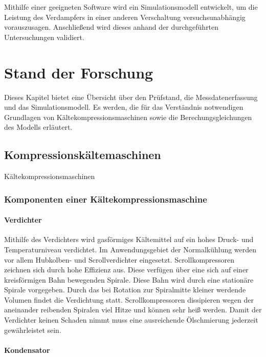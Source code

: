 Mithilfe einer geeigneten Software wird ein Simulationsmodell entwickelt, um die Leistung des Verdampfers in einer anderen Verschaltung versuchsunabhängig vorauszusagen. Anschließend wird dieses anhand der durchgeführten Untersuchungen validiert. 


\chapter{Stand der Forschung}
\label{cha:Technik}

Dieses Kapitel bietet eine Übersicht über den Prüfstand, die Messdatenerfassung und das Simulationsmodell. Es werden, die für das Verständnis notwendigen Grundlagen von Kältekompressionsmaschinen sowie die Berechungsgleichungen des Modells erläutert.

\section{Kompressionskältemaschinen}
\label{sec:Stand der Technik}

Kältekompressionsmaschinen

\subsection{Komponenten einer Kältekompressionsmaschine}
\label{subsec:Komponenten einer Kältekompressionsmaschine}

\subsubsection{Verdichter}
\label{subsubsec:Verdichter}

Mithilfe des Verdichters wird gasförmiges Kältemittel auf ein hohes Druck- und Temperaturniveau verdichtet. Im Anwendungsgebiet der Normalkühlung werden vor allem Hubkolben- und Scrollverdichter eingesetzt. Scrollkompressoren zeichnen sich durch hohe Effizienz aus. Diese verfügen über eine sich auf einer kreisförmigen Bahn bewegenden Spirale. Diese Bahn wird durch eine stationäre Spirale vorgegeben. Durch das bei Rotation zur Spiralmitte kleiner werdende Volumen findet die Verdichtung statt. Scrollkompressoren dissipieren wegen der aneinander reibenden Spiralen viel Hitze und können sehr heiß werden. Damit der Verdichter keinen Schaden nimmt muss eine ausreichende Ölschmierung jederzeit gewährleistet sein. 


\subsubsection{Kondensator}
\label{subsubsec:Kondensator}

